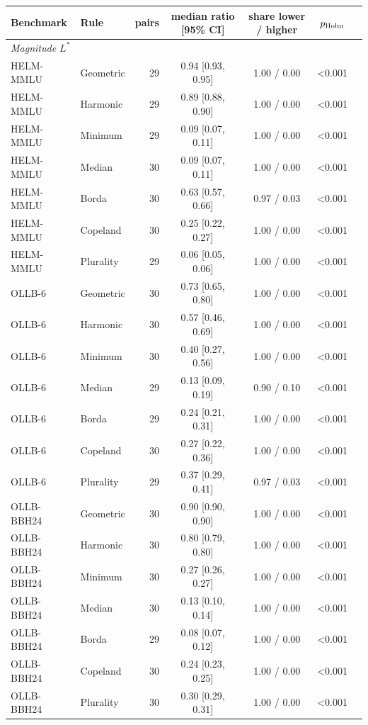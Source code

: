\begin{tabular}{llrcccc}\toprule
Benchmark & Rule & pairs & median ratio [95\% CI] & share lower / higher & $p_{\rm Holm}$\\\midrule
\multicolumn{6}{l}{\emph{Magnitude $L^*$}}\\
HELM-MMLU & Geometric & 29 & 0.94 [0.93, 0.95] & 1.00 / 0.00 & <0.001\\
HELM-MMLU & Harmonic & 29 & 0.89 [0.88, 0.90] & 1.00 / 0.00 & <0.001\\
HELM-MMLU & Minimum & 29 & 0.09 [0.07, 0.11] & 1.00 / 0.00 & <0.001\\
HELM-MMLU & Median & 30 & 0.09 [0.07, 0.11] & 1.00 / 0.00 & <0.001\\
HELM-MMLU & Borda & 30 & 0.63 [0.57, 0.66] & 0.97 / 0.03 & <0.001\\
HELM-MMLU & Copeland & 30 & 0.25 [0.22, 0.27] & 1.00 / 0.00 & <0.001\\
HELM-MMLU & Plurality & 29 & 0.06 [0.05, 0.06] & 1.00 / 0.00 & <0.001\\
OLLB-6 & Geometric & 30 & 0.73 [0.65, 0.80] & 1.00 / 0.00 & <0.001\\
OLLB-6 & Harmonic & 30 & 0.57 [0.46, 0.69] & 1.00 / 0.00 & <0.001\\
OLLB-6 & Minimum & 30 & 0.40 [0.27, 0.56] & 1.00 / 0.00 & <0.001\\
OLLB-6 & Median & 29 & 0.13 [0.09, 0.19] & 0.90 / 0.10 & <0.001\\
OLLB-6 & Borda & 29 & 0.24 [0.21, 0.31] & 1.00 / 0.00 & <0.001\\
OLLB-6 & Copeland & 30 & 0.27 [0.22, 0.36] & 1.00 / 0.00 & <0.001\\
OLLB-6 & Plurality & 29 & 0.37 [0.29, 0.41] & 0.97 / 0.03 & <0.001\\
OLLB-BBH24 & Geometric & 30 & 0.90 [0.90, 0.90] & 1.00 / 0.00 & <0.001\\
OLLB-BBH24 & Harmonic & 30 & 0.80 [0.79, 0.80] & 1.00 / 0.00 & <0.001\\
OLLB-BBH24 & Minimum & 30 & 0.27 [0.26, 0.27] & 1.00 / 0.00 & <0.001\\
OLLB-BBH24 & Median & 30 & 0.13 [0.10, 0.14] & 1.00 / 0.00 & <0.001\\
OLLB-BBH24 & Borda & 29 & 0.08 [0.07, 0.12] & 1.00 / 0.00 & <0.001\\
OLLB-BBH24 & Copeland & 30 & 0.24 [0.23, 0.25] & 1.00 / 0.00 & <0.001\\
OLLB-BBH24 & Plurality & 30 & 0.30 [0.29, 0.31] & 1.00 / 0.00 & <0.001\\

\end{tabular}
